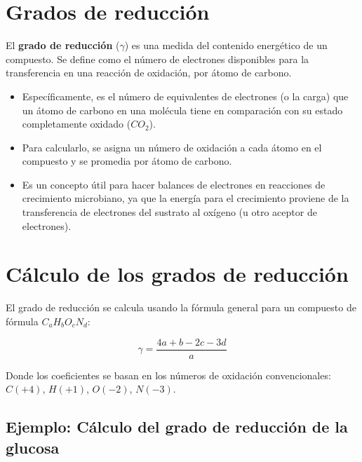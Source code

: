 

\section{Grados de reducción}

El \textbf{grado de reducción} ($\gamma$) es una medida del contenido energético de un compuesto. Se define como el número de electrones disponibles para la transferencia en una reacción de oxidación, por átomo de carbono.

\begin{itemize}
    \item Específicamente, es el número de equivalentes de electrones (o la carga) que un átomo de carbono en una molécula tiene en comparación con su estado completamente oxidado ($CO_2$).
    \item Para calcularlo, se asigna un número de oxidación a cada átomo en el compuesto y se promedia por átomo de carbono.
    \item Es un concepto útil para hacer balances de electrones en reacciones de crecimiento microbiano, ya que la energía para el crecimiento proviene de la transferencia de electrones del sustrato al oxígeno (u otro aceptor de electrones).
\end{itemize}

\section{Cálculo de los grados de reducción}

El grado de reducción se calcula usando la fórmula general para un compuesto de fórmula $C_aH_bO_cN_d$:

\begin{equation}
    \gamma = \frac{4a + b - 2c - 3d}{a}
\end{equation}

Donde los coeficientes se basan en los números de oxidación convencionales: $C(+4)$, $H(+1)$, $O(-2)$, $N(-3)$.

\subsection*{Ejemplo: Cálculo del grado de reducción de la glucosa}

